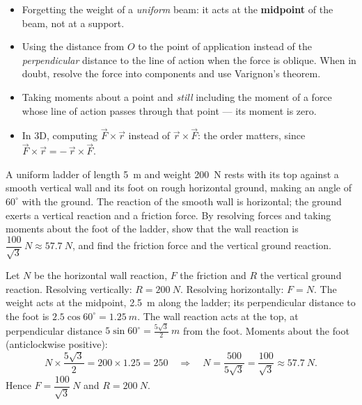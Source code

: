\documentclass[11pt]{article}
\begin{document}
\begin{attention}
\begin{itemize}
\item Forgetting the weight of a \emph{uniform} beam: it acts at the \textbf{midpoint} of the beam, not at a support.
\item Using the distance from $O$ to the point of application instead of the \emph{perpendicular} distance to the line of action when the force is oblique. When in doubt, resolve the force into components and use Varignon's theorem.
\item Taking moments about a point and \emph{still} including the moment of a force whose line of action passes through that point --- its moment is zero.
\item In 3D, computing $\vec{F} \times \vec{r}$ instead of $\vec{r} \times \vec{F}$: the order matters, since $\vec{F} \times \vec{r} = -\,\vec{r} \times \vec{F}$.
\end{itemize}
\end{attention}

\begin{exercice}
A uniform ladder of length \SI{5}{m} and weight \SI{200}{N} rests with its top against a smooth vertical wall and its foot on rough horizontal ground, making an angle of $60^{\circ}$ with the ground. The reaction of the smooth wall is horizontal; the ground exerts a vertical reaction and a friction force. By resolving forces and taking moments about the foot of the ladder, show that the wall reaction is $\dfrac{100}{\sqrt{3}}\ \si{N} \approx \SI{57.7}{N}$, and find the friction force and the vertical ground reaction.
\end{exercice}

\begin{corrige}[Exercise 1]
Let $N$ be the horizontal wall reaction, $F$ the friction and $R$ the vertical ground reaction. Resolving vertically: $R = \SI{200}{N}$. Resolving horizontally: $F = N$. The weight acts at the midpoint, \SI{2.5}{m} along the ladder; its perpendicular distance to the foot is $2.5\cos 60^{\circ} = \SI{1.25}{m}$. The wall reaction acts at the top, at perpendicular distance $5\sin 60^{\circ} = \tfrac{5\sqrt{3}}{2}\ \si{m}$ from the foot. Moments about the foot (anticlockwise positive):
\[ N \times \frac{5\sqrt{3}}{2} = 200 \times 1.25 = 250
\quad\Longrightarrow\quad
N = \frac{500}{5\sqrt{3}} = \frac{100}{\sqrt{3}} \approx \SI{57.7}{N}. \]
Hence $F = \dfrac{100}{\sqrt{3}}\ \si{N}$ and $R = \SI{200}{N}$.
\end{corrige}
\end{document}
